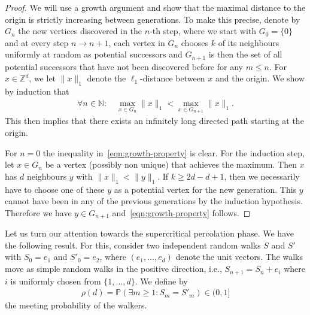 \documentclass{article}
\newcommand{\N}{\mathbb{N}}
\theoremstyle{definition}
\renewcommand{\P}{\mathbb{P}}
\newcommand{\1}{\mathbbm{1}}
\newcommand{\0}{\mathbf{o}}
\newcommand{\Z}{\mathbb{Z}}
\begin{document}
\begin{proof}
    We will use a growth argument and show that the maximal distance to the origin is strictly increasing between generations. To make this precise, denote by $G_n$ the new vertices discovered in the $n$-th step, where we start with $G_0 = \{0\}$ and at every step $n \to n+1$, each vertex in $G_n$ chooses $k$ of its neighbours uniformly at random as potential successors and $G_{n+1}$ is then the set of all potential successors that have not been discovered before for any $m  \leq n$. For $x\in\Z^d$, we let $\|x\|_1$ denote the $\ell_1$-distance between $x$ and the origin. We show by induction that 
    \begin{align}\label{eqn:growth-property}
         \forall n  \in \N:   \quad \max_{x \in G_n}\|x\|_1 < \max_{x \in G_{n+1}}\|x\|_1.  
    \end{align}
    This then implies that there exists an infinitely long directed path starting at the origin. 
    
    For $n=0$ the inequality in~\eqref{eqn:growth-property} is clear. For the induction step, let $x \in G_n$ be a vertex (possibly non unique) that achieves the maximum. Then $x$ has $d$ neighbours $y$ with $\|x\|_1 < \|y\|_1$. If $k  \geq 2d-d+1$, then we necessarily have to choose one of these $y$ as a potential vertex for the new generation. This $y$ cannot have been in any of the previous generations by the induction hypothesis. Therefore we have $y \in G_{n+1}$ and~\eqref{eqn:growth-property} follows. 
    \end{proof}

Let us turn our attention towards the supercritical percolation phase. We have the following result. For this, consider two independent random walks $S$ and $S'$ with $S_0=e_1$ and $S'_0=e_2$, where $(e_1,\dots, e_d)$ denote the unit vectors. The walks move as simple random walks in the positive direction, i.e., $S_{n+1}=S_n+e_i$ where $i$ is uniformly chosen from $\{1,\dots ,d\}$. We define by
\begin{align*}
\rho(d)=\P(\exists m\ge 1\colon S_m=S'_m)\in(0,1]
\end{align*}
the meeting probability of the walkers. 
\end{document}

